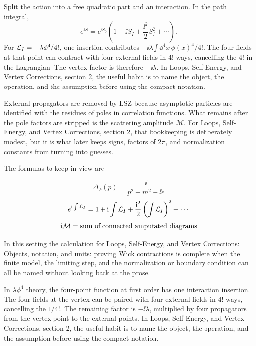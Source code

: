 Split the action into a free quadratic part and an interaction.  In the path integral,
\[
  e^{\ii S}=e^{\ii S_0}\left(1+\ii S_I+\frac{\ii^2}{2}S_I^2+\cdots\right).
\]
For \(\mathcal L_I=-\lambda\phi^4/4!\), one insertion contributes \(-\ii\lambda\int\dd^4x\,\phi(x)^4/4!\).  The four fields at that point can contract with four external fields in \(4!\) ways, cancelling the \(4!\) in the Lagrangian.  The vertex factor is therefore \(-\ii\lambda\).  In Loops, Self-Energy, and Vertex Corrections, section 2, the useful habit is to name the object, the operation, and the assumption before using the compact notation.

External propagators are removed by LSZ because asymptotic particles are identified with the residues of poles in correlation functions.  What remains after the pole factors are stripped is the scattering amplitude \(\mathcal M\).  For Loops, Self-Energy, and Vertex Corrections, section 2, that bookkeeping is deliberately modest, but it is what later keeps signs, factors of \(2\pi\), and normalization constants from turning into guesses.

The formulas to keep in view are

\[
  \Delta_F(p)=\frac{\ii}{p^2-m^2+\ii\epsilon}
\]
\[
  e^{\mathrm i\int\mathcal L_I}=1+\mathrm i\int\mathcal L_I+\frac{\mathrm i^2}{2}\left(\int\mathcal L_I\right)^2+\cdots
\]
\[
  \mathrm i\mathcal M=\hbox{sum of connected amputated diagrams}
\]

In this setting the calculation for Loops, Self-Energy, and Vertex Corrections: Objects, notation, and units: proving Wick contractions is complete when the finite model, the limiting step, and the normalization or boundary condition can all be named without looking back at the prose.




\begin{example}
In \(\lambda\phi^4\) theory, the four-point function at first order has one interaction insertion.  The four fields at the vertex can be paired with four external fields in \(4!\) ways, cancelling the \(1/4!\).  The remaining factor is \(-\ii\lambda\), multiplied by four propagators from the vertex point to the external points.  In Loops, Self-Energy, and Vertex Corrections, section 2, the useful habit is to name the object, the operation, and the assumption before using the compact notation.
\end{example}



